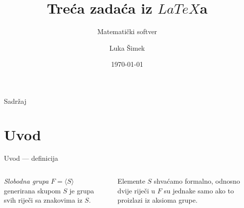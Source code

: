 \documentclass{beamer}
\title[Zadaća iz $LaTeX$a --- Beamer]{Treća zadaća iz $LaTeX$a}
\subtitle{Matematički softver}
\author{Luka Šimek}
\institute[PMF--MO]{Prirodoslovno-matematički fakultet --- Matematički odsjek\\Sveučilište u Zagrebu}
\date{\today}
\begin{document}
\begin{frame}[plain]
\titlepage
\end{frame}

\begin{frame}{Sadržaj}
\tableofcontents
\end{frame}

\section{Uvod}
\begin{frame}{Uvod --- definicija}
\begin{columns}[t]

\begin{definicija}
\emph{Slobodna grupa} $F = \langle S \rangle$ generirana skupom $S$ je grupa svih riječi sa znakovima iz $S$. 
\end{definicija}



\begin{napomena}
Elemente $S$ shvaćamo formalno, odnosno dvije riječi u $F$ su jednake samo ako to proizlazi iz aksioma grupe.
\end{napomena}


\end{columns}

\end{frame}
\end{document}
